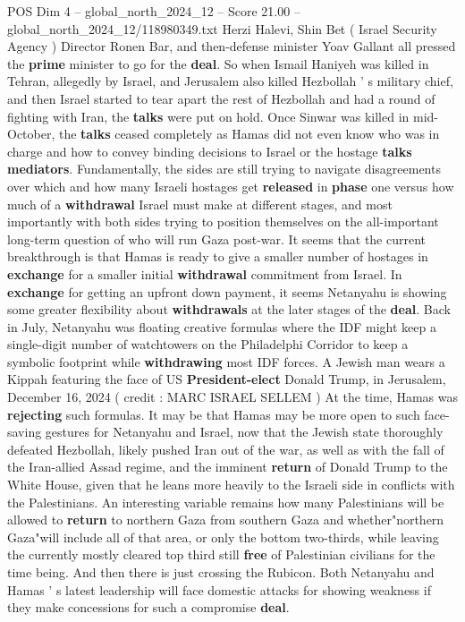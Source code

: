 \begin{textsample}{POS Dim 4 – global\_north\_2024\_12 – Score 21.00 – global\_north\_2024\_12/118980349.txt}
Herzi Halevi, Shin Bet ( Israel Security Agency ) Director Ronen Bar, and then-defense minister Yoav Gallant all pressed the \textbf{prime} minister to go for the \textbf{deal}.
So when Ismail Haniyeh was killed in Tehran, allegedly by Israel, and Jerusalem also killed Hezbollah ' s military chief, and then Israel started to tear apart the rest of Hezbollah and had a round of fighting with Iran, the \textbf{talks} were put on hold.
Once Sinwar was killed in mid-October, the \textbf{talks} ceased completely as Hamas did not even know who was in charge and how to convey binding decisions to Israel or the hostage \textbf{talks} \textbf{mediators}.
Fundamentally, the sides are still trying to navigate disagreements over which and how many Israeli hostages get \textbf{released} in \textbf{phase} one versus how much of a \textbf{withdrawal} Israel must make at different stages, and most importantly with both sides trying to position themselves on the all-important long-term question of who will run Gaza post-war.
It seems that the current breakthrough is that Hamas is ready to give a smaller number of hostages in \textbf{exchange} for a smaller initial \textbf{withdrawal} commitment from Israel.
In \textbf{exchange} for getting an upfront down payment, it seems Netanyahu is showing some greater flexibility about \textbf{withdrawals} at the later stages of the \textbf{deal}.
Back in July, Netanyahu was floating creative formulas where the IDF might keep a single-digit number of watchtowers on the Philadelphi Corridor to keep a symbolic footprint while \textbf{withdrawing} most IDF forces.
A Jewish man wears a Kippah featuring the face of US \textbf{President-elect} Donald Trump, in Jerusalem, December 16, 2024 ( credit : MARC ISRAEL SELLEM ) At the time, Hamas was \textbf{rejecting} such formulas.
It may be that Hamas may be more open to such face-saving gestures for Netanyahu and Israel, now that the Jewish state thoroughly defeated Hezbollah, likely pushed Iran out of the war, as well as with the fall of the Iran-allied Assad regime, and the imminent \textbf{return} of Donald Trump to the White House, given that he leans more heavily to the Israeli side in conflicts with the Palestinians.
An interesting variable remains how many Palestinians will be allowed to \textbf{return} to northern Gaza from southern Gaza and whether"northern Gaza"will include all of that area, or only the bottom two-thirds, while leaving the currently mostly cleared top third still \textbf{free} of Palestinian civilians for the time being.
And then there is just crossing the Rubicon.
Both Netanyahu and Hamas ' s latest leadership will face domestic attacks for showing weakness if they make concessions for such a compromise \textbf{deal}.

\end{textsample}
